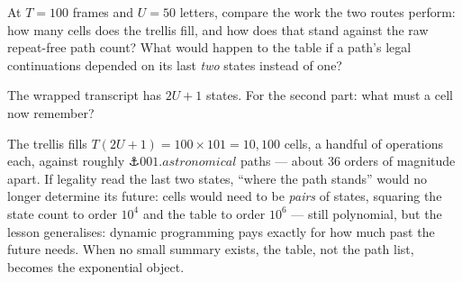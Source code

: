 \begin{problem}[stretch]
At $T = 100$ frames and $U = 50$ letters, compare the work the two
routes perform: how many cells does the trellis fill, and how does
that stand against the raw repeat-free path count? What would happen
to the table if a path's legal continuations depended on its last
\emph{two} states instead of one?
\begin{hint}
The wrapped transcript has $2U + 1$ states. For the second part: what
must a cell now remember?
\end{hint}
\begin{solution}
The trellis fills $T (2U + 1) = 100 \times 101 = 10{,}100$ cells, a
handful of operations each, against roughly $\anchor{001.astronomical}$
paths — about $36$ orders of magnitude apart. If legality read the
last two states, ``where the path stands'' would no longer determine
its future: cells would need to be \emph{pairs} of states, squaring
the state count to order $10^4$ and the table to order $10^6$ —
still polynomial, but the lesson generalises: dynamic programming
pays exactly for how much past the future needs. When no small
summary exists, the table, not the path list, becomes the
exponential object.
\end{solution}
\end{problem}
